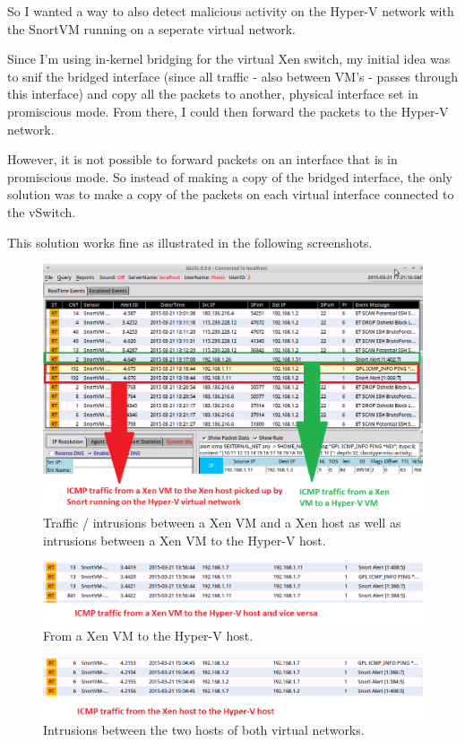 \documentclass[11pt, a4paper]{article}
\begin{document}
\begin{itemize}
So I wanted a way to also detect malicious activity on the Hyper-V network with the SnortVM running on a seperate virtual network.

Since I'm using in-kernel bridging for the virtual Xen switch, my initial idea was to snif the bridged interface (since all traffic - also between VM's - passes through this interface) and copy all the packets to another, physical interface set in promiscious mode. From there, I could then forward the packets to the Hyper-V network.

However, it is not possible to forward packets on an interface that is in promiscious mode. So instead of making a copy of the bridged interface, the only solution was to make a copy of the packets on each virtual interface connected to the vSwitch.

This solution works fine as illustrated in the following screenshots.
\end{itemize}
\clearpage
\begin{figure}[h]
    \centering
    \includegraphics[width=1\textwidth]{Snort_4.png}
   \caption{Traffic / intrusions between a Xen VM and a Xen host as well as intrusions between a Xen VM to the Hyper-V host.}
\end{figure}
\begin{figure}[h]
    \centering
    \includegraphics[width=1\textwidth]{Snort_5.png}
   \caption{From a Xen VM to the Hyper-V host.}
\end{figure}
\begin{figure}[h]
    \centering
    \includegraphics[width=1\textwidth]{Snort_6.png}
   \caption{Intrusions between the two hosts of both virtual networks.}
\end{figure}
\end{document}
